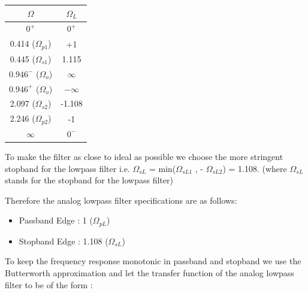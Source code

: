 \documentclass{article}
\begin{document}
\begin{table}[H]
		\begin{center}
		\begin{tabular}{|c|c|}
			\hline
			$\Omega$ & $\Omega_L$\\
			
			\hline
                $0^{+}$ & $0^{+}$\\
                \hline
                0.414 ($\Omega_{p1}$) & +1 \\
                \hline
                0.445 ($\Omega_{s1}$) & 1.115\\
                \hline
                $0.946^{-}$ ($\Omega_o$) & $\infty$\\
                \hline
                $0.946^{+}$ ($\Omega_o$) & $-\infty$\\
                \hline
                2.097 ($\Omega_{s2}$)  & -1.108\\
                \hline
                2.246 ($\Omega_{p2}$) & -1\\
                \hline
                $\infty$ & $0^{-}$\\
                \hline
            
		\end{tabular}
		\end{center}
\end{table}

\vspace{1em}
\noindent
To make the filter as close to ideal as possible we choose the more stringent stopband for the lowpass filter i.e. $\Omega_{sL}$ = min($\Omega_{sL1}$ , - $\Omega_{sL2}$) = 1.108. (where $\Omega_{sL}$ stands for the stopband for the lowpass filter)

\vspace{1em}
\noindent
Therefore the analog lowpass filter specifications are as follows:
\begin{itemize}
    \item Passband Edge : 1 ($\Omega_{pL}$)
    \item Stopband Edge : 1.108 ($\Omega_{sL}$)
\end{itemize}

To keep the frequency response monotonic in passband and stopband we use the Butterworth approximation and let the transfer function of the analog lowpass filter to be of the form : 
\end{document}
